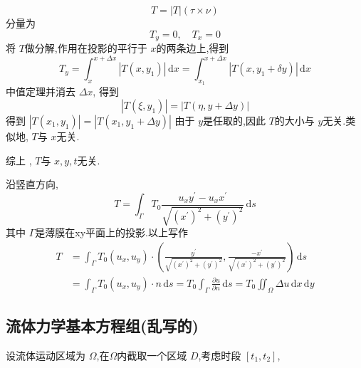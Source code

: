 \documentclass[../../PDE.tex]{subfiles}
\begin{document}
\begin{enumerate}
\[            T =  \left| T \right| \left( \tau  \times \nu  \right)  
            \]   分量为 \[
            T_{y} =  0,\quad  T_{x}= 0
            \]将 \(  T  \)做分解,作用在投影的平行于 \(  x  \)的两条边上,得到 \[
            T_{y} =  \int_{x}^{x+    \Delta  x}  \left| T\left( x,y_1 \right)  \right|\,\mathrm{d} x =  \int_{x_1}^{x+   \Delta  x} \left| T\left( x,y_1+  \delta y \right)  \right|\,\mathrm{d} x  
            \] 中值定理并消去 \(   \Delta x  \),  得到 \[
            \left| T\left( \xi,y_1 \right)  \right|  =    \left|  T\left( \eta ,y+  \Delta y \right)  \right| 
            \]得到 \(  \left| T\left( x_1,y_1 \right)  \right|=  \left| T\left( x_1,y_1+  \Delta y \right)  \right|    \)
            由于 \(  y  \)是任取的,因此 \(  T  \)的大小与 \(  y \)无关.类似地, \(  T  \)与 \(  x \)无关.  
            
            综上 , \(  T  \)与 \(  x,y,t  \)无关.
            
            沿竖直方向, \[
            T =  \int _{ \Gamma }T_0 \frac{u_{x}y^{\prime} -u_{x}x^{\prime}  }{\sqrt{\left( x^{\prime}  \right)^{2}+ \left( y^{\prime}  \right)^{2}  } }\,\mathrm{d} s 
            \]其中 \(   \Gamma   \)是薄膜在xy平面上的投影.以上写作 \[
           \begin{aligned}
            T& =  \int_{ \Gamma } T_0 \left( u_{x},u_{y} \right) \cdot \left(  \frac{y^{\prime}  }{\sqrt{\left( x^{\prime}  \right)^{2}+ \left( y^{\prime}  \right)^{2}  } }, \frac{-x^{\prime}  }{ \sqrt{\left( x^{\prime}  \right)^{2}+ \left( y^{\prime}  \right)^{2}  }}   \right)  \,\mathrm{d} s\\ 
             &  = \int_{ \Gamma } T_0 \left( u_{x},u_{y} \right)\cdot n \,\mathrm{d} s = T_0 \int_{ \Gamma }\frac{\partial u}{\partial n}\,\mathrm{d} s 
              =  T_0 \iint_{ \Omega }  \Delta u\,\mathrm{d} x \,\mathrm{d} y 
           \end{aligned}
            \] 
\end{enumerate}



\subsection{流体力学基本方程组(乱写的)}

设流体运动区域为 \(   \Omega   \),在\(   \Omega   \)内截取一个区域 \(  D  \),考虑时段 \(  \left[ t_1,t_2 \right]   \),
\end{document}
